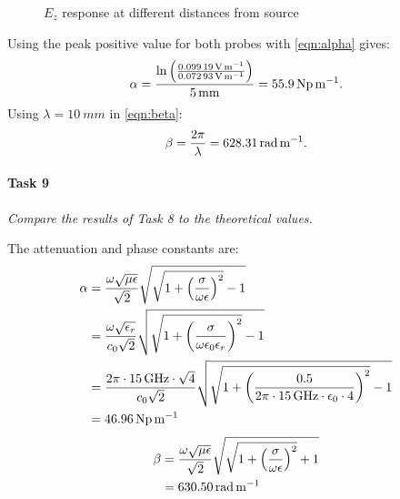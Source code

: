 \begin{figure}[tbph]
	\centering
	\caption{$E_z$ response at different distances from source}
	\label{fig:Task3-probes}
\end{figure}

Using the peak positive value for both probes with \eqref{eqn:alpha} gives:
\begin{equation*}
	\alpha = { \ln \left( { \SI{0.09919}{\volt\per\meter} \over \SI{0.07293}{\volt\per\meter} } \right) \over \SI{5}{\milli\meter}} = \SI{55.9}{\neper\per\meter}.
\end{equation*}
Using $\lambda = \SI{10}{mm}$ in \eqref{eqn:beta}:
\begin{equation*}
	\beta = {2 \pi \over \lambda} = \SI{628.31}{\radian\per\meter}.
\end{equation*}

\paragraph{Task 9} \textit{Compare the results of Task 8 to the theoretical values.}

The attenuation and phase constants are:
\begin{align*}
	\alpha &= { \omega \sqrt{\mu \epsilon} \over \sqrt{2} } \sqrt{\sqrt{1 + \left( {\sigma \over \omega \epsilon} \right)^2} - 1} \\
	&= { \omega \sqrt{\epsilon_r} \over c_0 \sqrt{2} } \sqrt{\sqrt{1 + \left( {\sigma \over \omega \epsilon_0 \epsilon_r} \right)^2} - 1} \\
	&= { 2 \pi \cdot \SI{15}{\giga\hertz} \cdot \sqrt{4} \over c_0 \sqrt{2} } \sqrt{\sqrt{1 + \left( {0.5 \over 2 \pi \cdot \SI{15}{\giga\hertz} \cdot \epsilon_0 \cdot 4} \right)^2} - 1} \\
	&= \SI{46.96}{\neper\per\meter}
\end{align*}
\begin{align*}
	\beta &= { \omega \sqrt{\mu \epsilon} \over \sqrt{2} } \sqrt{\sqrt{1 + \left( {\sigma \over \omega \epsilon} \right)^2} + 1} \\
	&= \SI{630.50}{\radian\per\meter}
\end{align*}

